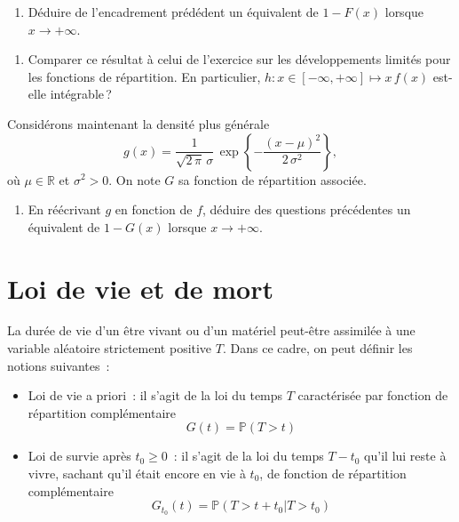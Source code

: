 
\label{I-fdrgaussequi}

\begin{enumerate}
\def\labelenumi{\arabic{enumi}.}
\setcounter{enumi}{4}
\tightlist
\item
  Déduire de l'encadrement prédédent un équivalent de \(1-F(x)\) lorsque
  \(x\to+\infty\).
\end{enumerate}


\begin{enumerate}
\def\labelenumi{\arabic{enumi}.}
\setcounter{enumi}{5}
\tightlist
\item
  Comparer ce résultat à celui de l'exercice sur les développements
  limités pour les fonctions de répartition. En particulier,
  \(h:x\in[-\infty,+\infty] \mapsto x\,f(x)\) est-elle intégrable\,?
\end{enumerate}

\label{I-fdrgaussgen}
Considérons maintenant la densité plus générale
\[g(x) = \dfrac{1}{\sqrt{2\,\pi}\,\sigma}\, \exp\left\{-\dfrac{(x-\mu)^2}{2\,\sigma^2} \right\},\]
où \(\mu \in \mathbb{R}\) et \(\sigma^2 > 0\). On note \(G\) sa fonction
de répartition associée.

\begin{enumerate}
\def\labelenumi{\arabic{enumi}.}
\setcounter{enumi}{6}
\tightlist
\item
  En réécrivant \(g\) en fonction de \(f\), déduire des questions
  précédentes un équivalent de \(1-G(x)\) lorsque \(x\to+\infty\).
\end{enumerate}


\section{Loi de vie et de mort}\label{I-loi-de-vie-et-de-mort}

La durée de vie d'un être vivant ou d'un matériel peut-être assimilée à
une variable aléatoire strictement positive \(T\). Dans ce cadre, on
peut définir les notions suivantes~:

\begin{itemize}
\tightlist
\item
  Loi de vie a priori~: il s'agit de la loi du temps \(T\) caractérisée
  par fonction de répartition complémentaire \[G(t) = \mathbb{P}(T>t)\]
\item
  Loi de survie après \(t_0 \geq 0\)~: il s'agit de la loi du temps
  \(T-t_0\) qu'il lui reste à vivre, sachant qu'il était encore en vie à
  \(t_0\), de fonction de répartition complémentaire
  \[G_{t_0}(t) =\mathbb{P}(T>t+t_0|T>t_0)\]
\end{itemize}

